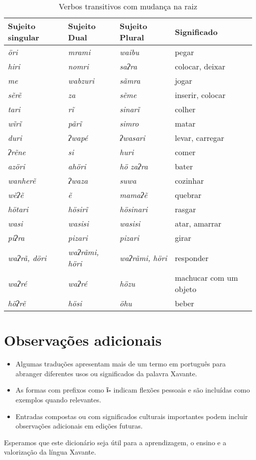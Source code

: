 \begin{table}
\begin{tabular}{llll}\toprule
 Sujeito singular & Sujeito Dual & Sujeito Plural & Significado  \\\midrule
\textit{öri} & \textit{mrami} & \textit{waibu} & pegar\\
\textit{hiri} & \textit{nomri} & \textit{saʔra} & colocar, deixar \\
\textit{me} & \textit{wabzuri} & \textit{sãmra} & jogar \\
\textit{sẽrẽ} & \textit{za} & \textit{sẽme} & inserir, colocar\\
\textit{tari} & \textit{rĩ} & \textit{sinarĩ} & colher \\
\textit{wĩrĩ} & \textit{pãrĩ} & \textit{simro} & matar \\ 
\textit{duri} & \textit{ʔwapé} & \textit{ʔwasari} & levar, carregar\\
\textit{ʔrẽne} & \textit{si} & \textit{huri} & comer \\
\textit{azöri} & \textit{ahöri} & \textit{hö zaʔra} & bater \\
\textit{wanherẽ} & \textit{ʔwaza} & \textit{suwa} & cozinhar \\
\textit{wẽʔẽ} & \textit{ẽ} & \textit{mamaʔẽ} & quebrar \\
\textit{hötari} & \textit{hösirĩ} & \textit{hösinari} & rasgar \\
\textit{wasi} & \textit{wasisi} & \textit{wasisi} & atar, amarrar \\
\textit{piʔra} & \textit{pizari} & \textit{pizari} & girar \\
\textit{waʔrã, döri} & \textit{waʔrãmi, höri} & \textit{waʔrãmi, höri} & responder \\
\textit{waʔré} & \textit{waʔré} & \textit{hözu} & machucar com um objeto \\
\textit{höʔrẽ} & \textit{hösi} & \textit{öhu} & beber \\\bottomrule
\end{tabular}
\caption{Verbos transitivos com mudança na raiz}
\label{tab:suppletiveTransVerbs}
\end{table}



\section*{Observações adicionais}

\begin{itemize}
  \item Algumas traduções apresentam mais de um termo em português para abranger diferentes usos ou significados da palavra Xavante.
  \item As formas com prefixos como \textbf{ĩ-} indicam flexões pessoais e são incluídas como exemplos quando relevantes.
  \item Entradas compostas ou com significados culturais importantes podem incluir observações adicionais em edições futuras.
\end{itemize}

Esperamos que este dicionário seja útil para a aprendizagem, o ensino e a valorização da língua Xavante.